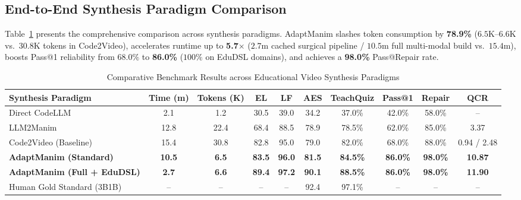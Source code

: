 \documentclass[11pt, a4paper]{article}
\begin{document}
\subsection{End-to-End Synthesis Paradigm Comparison}
Table~\ref{tab:main_results} presents the comprehensive comparison across synthesis paradigms. AdaptManim slashes token consumption by \textbf{78.9\%} ($6.5\text{K}\text{--}6.6\text{K}$ vs.\ $30.8\text{K}$ tokens in Code2Video), accelerates runtime up to \textbf{5.7$\times$} ($2.7\text{m}$ cached surgical pipeline / $10.5\text{m}$ full multi-modal build vs.\ $15.4\text{m}$), boosts Pass@1 reliability from $68.0\%$ to \textbf{86.0\%} ($100\%$ on EduDSL domains), and achieves a \textbf{98.0\%} Pass@Repair rate.

\begin{table}[htbp]
\centering
\small
\caption{Comparative Benchmark Results across Educational Video Synthesis Paradigms}
\label{tab:main_results}
\vspace{0.4em}
\begin{tabular}{l c c c c c c c c c}
\toprule
\textbf{Synthesis Paradigm} & \textbf{Time (m)} & \textbf{Tokens (K)} & \textbf{EL} & \textbf{LF} & \textbf{AES} & \textbf{TeachQuiz} & \textbf{Pass@1} & \textbf{Repair} & \textbf{QCR} \\
\midrule
Direct CodeLLM & 2.1 & 1.2 & 30.5 & 39.0 & 34.2 & 37.0\% & 42.0\% & 58.0\% & -- \\
LLM2Manim & 12.8 & 22.4 & 68.4 & 88.5 & 78.9 & 78.5\% & 62.0\% & 85.0\% & 3.37 \\
Code2Video (Baseline) & 15.4 & 30.8 & 82.8 & 95.0 & 79.0 & 82.0\% & 68.0\% & 88.0\% & 0.94 / 2.48 \\
\rowcolor{lightgray}
\textbf{AdaptManim (Standard)} & \textbf{10.5} & \textbf{6.5} & \textbf{83.5} & \textbf{96.0} & \textbf{81.5} & \textbf{84.5\%} & \textbf{86.0\%} & \textbf{98.0\%} & \textbf{10.87} \\
\rowcolor{lightgray}
\textbf{AdaptManim (Full + EduDSL)} & \textbf{2.7} & \textbf{6.6} & \textbf{89.4} & \textbf{97.2} & \textbf{90.1} & \textbf{88.5\%} & \textbf{86.0\%} & \textbf{98.0\%} & \textbf{11.90} \\
\midrule
Human Gold Standard (3B1B) & -- & -- & -- & -- & 92.4 & 97.1\% & -- & -- & -- \\
\bottomrule
\end{tabular}
\end{table}
\end{document}
